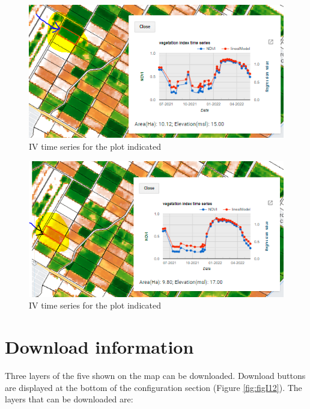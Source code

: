 \documentclass[
]{book}
\begin{document}
\begin{figure}

{\centering \includegraphics{./images/Figure60} 

}

\caption{IV time series for the plot indicated}\label{fig:figI10}
\end{figure}
\begin{figure}

{\centering \includegraphics{./images/Figure61} 

}

\caption{IV time series for the plot indicated}\label{fig:figI11}
\end{figure}

\hypertarget{download-information}{%
\section{Download information}\label{download-information}}

Three layers of the five shown on the map can be downloaded. Download buttons are displayed at the bottom of the configuration section (Figure \ref{fig:figI12}). The layers that can be downloaded are:
\end{document}
